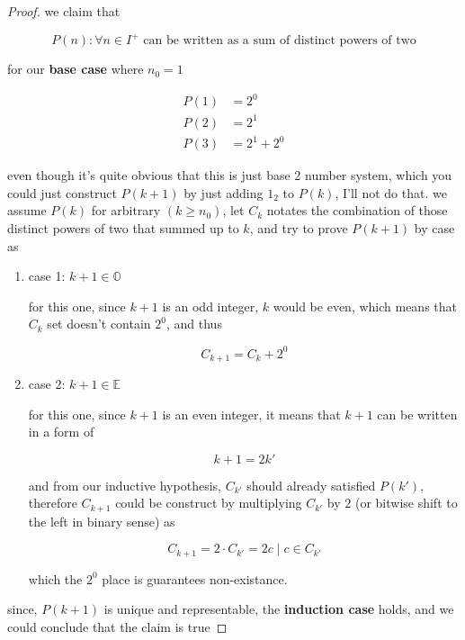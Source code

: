 \begin{proof}

we claim that

\[
P(n) : \forall n \in I^+ \text{ can be written as a sum of distinct powers
of two}
\]

for our \textbf{base case} where $n_0 = 1$

\[
\begin{aligned}
P(1) &= 2^0 \\
P(2) &= 2^1 \\
P(3) &= 2^1 + 2^0
\end{aligned}
\]

even though it's quite obvious that this is just base 2 number system, which
you could just construct $P(k+1)$ by just adding $1_2$ to $P(k)$, I'll not
do that. we assume $P(k)$ for arbitrary $(k \ge n_0)$, let $C_k$ notates the
combination of those distinct powers of two that summed up to $k$, and try
to prove $P(k+1)$ by case as

\begin{enumerate}
\item case 1: $k + 1 \in \mathbb{O}$

for this one, since $k + 1$ is an odd integer, $k$ would be even, which
means that $C_k$ set doesn't contain $2^0$, and thus

\[
C_{k + 1} = C_k + 2^0
\]

\item case 2: $k + 1 \in \mathbb{E}$

for this one, since $k + 1$ is an even integer, it means that $k + 1$ can be
written in a form of

\[
k + 1 = 2k'
\]

and from our inductive hypothesis, $C_{k'}$ should already satisfied
$P(k')$, therefore $C_{k+1}$ could be construct by multiplying $C_{k'}$ by
$2$ (or bitwise shift to the left in binary sense) as

\[
C_{k+1} = 2 \cdot C_{k'} = {2c \mid c \in C_{k'}}
\]

which the $2^0$ place is guarantees non-existance.
\end{enumerate}

since, $P(k+1)$ is unique and representable, the \textbf{induction case}
holds, and we could conclude that the claim is true

\end{proof}

\vspace{1em}
\hrulefill

\newpage 

